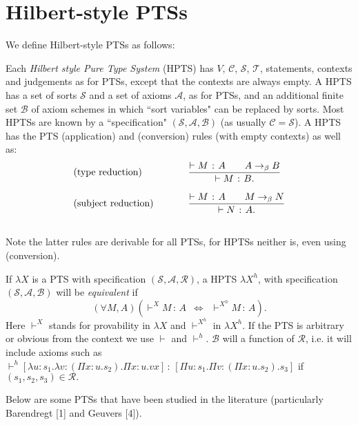 \documentclass{LMCS}
\def\:{\mathbin{\,:\,}}
\begin{document}
\section{Hilbert-style PTSs}\label{S:HSPTS}

 \noindent We define Hilbert-style PTSs as follows:

\begin{defi}[HPTS]

  Each \emph{Hilbert style Pure Type System} (HPTS) has $V$, $\mathcal
  C$, $\mathcal S$, $\mathcal T$, statements, contexts and judgements
  as for PTSs, except that the contexts are always empty. A HPTS has a
  set of sorts $\mathcal S$ and a set of axioms ${\mathcal A}$, as for
  PTSs, and an additional finite set ${\mathcal B}$ of axiom schemes
  in which ``sort variables" can be replaced by sorts.  Most HPTSs are
  known by a ``specification" $(\mathcal S, {\mathcal A},\mathcal B)$
  (as usually ${\mathcal C}=\mathcal S$). A HPTS has the PTS
  (application) and (conversion) rules (with empty contexts) as well
  as:
\bigskip
{\small\[\begin{tabular}{lllllll}
(type reduction)&&& $\displaystyle{{\vdash M\:A\qquad
   A\rightarrow_{\beta} B\over\vdash M\:B.}}$\cr\cr
(subject reduction)&&&$\displaystyle{{\vdash M\:A\qquad
   M\rightarrow_{\beta} N\over\vdash N\:A.}}$\cr\cr
\end{tabular}
\]}
\end{defi}
  Note the latter rules are derivable for all PTSs, for HPTSs neither
  is, even using (conversion).

\begin{defi}

  If $\lambda X$ is a PTS with specification $(\mathcal S,{\mathcal
  A,}\mathcal R)$, a HPTS $\lambda X^h$, with specification
  $(\mathcal S,{\mathcal A},\mathcal B)$ will be \emph{equivalent} if
\[(\forall M,A)(\vdash^X M\:A\enspace\Leftrightarrow\enspace\vdash^{X^h} M\:A).\]
  Here $\vdash^X$ stands for provability in $\lambda X$ and $\vdash
  ^{X^h}$ in $\lambda X^h$.  If the PTS is arbitrary or obvious from
  the context we use $\vdash$ and $\vdash^h$. $\mathcal B$ will a
  function of $\mathcal R$, i.e. it will include axioms such as
  $\vdash^h[\lambda u{:}s_1 .\lambda v{:}(\Pi x{:}u . s_2) .\Pi
  x{:}u.vx]\:[\Pi u{:}s_1.\Pi v{:}(\Pi x{:}u. s_2).s_3]$ if
  $(s_1,s_2,s_3)\in\mathcal R.$
\end{defi}

  Below are some PTSs that have been studied in the literature
  (particularly Barendregt [1] and Geuvers [4]).
\end{document}
